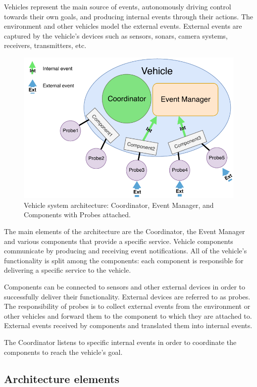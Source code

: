 \documentclass{memoir}
\begin{document}
Vehicles represent the main source of events, autonomously driving control towards their own goals, and producing internal events through their actions.
The environment and other vehicles model the external events. External events are captured by the vehicle's devices such as sensors, sonars, camera systems, receivers, transmitters, etc.

\begin{figure}
	\centering
	\includegraphics[width=0.7\linewidth]{implementation_details/vehicle_high-level_architecture.pdf}
	\caption{Vehicle system architecture: Coordinator, Event Manager, and Components with Probes attached.}
	\label{fig:vehicle-architecture}
\end{figure}

The main elements of the architecture are the Coordinator, the Event Manager and various components that provide a specific service.
Vehicle components communicate by producing and receiving event notifications. All of the vehicle's functionality is split among the components: each component is responsible for delivering a specific service to the vehicle.

Components can be connected to sensors and other external devices in order to successfully deliver their functionality. External devices are referred to as probes.
The responsibility of probes is to collect external events from the environment or other vehicles and forward them to the component to which they are attached to.
External events received by components and translated them into internal events.


The Coordinator listens to specific internal events in order to coordinate the components to reach the vehicle's goal.

\subsection{Architecture elements}
\end{document}
